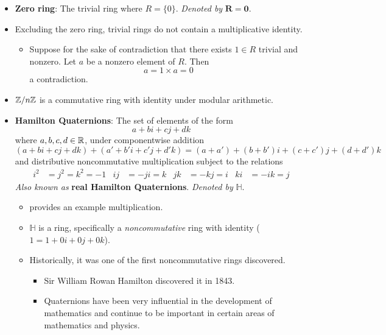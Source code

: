 \documentclass[../notes.tex]{subfiles}
\begin{document}
\begin{itemize}
\begin{itemize}
    \end{itemize}
    \item \textbf{Zero ring}: The trivial ring where $R=\{0\}$. \emph{Denoted by} $\bm{R=0}$.
    \item Excluding the zero ring, trivial rings do not contain a multiplicative identity.
    \begin{itemize}
        \item Suppose for the sake of contradiction that there exists $1\in R$ trivial and nonzero. Let $a$ be a nonzero element of $R$. Then
        \begin{equation*}
            a = 1\times a = 0
        \end{equation*}
        a contradiction.
    \end{itemize}
    \item $\mathbb{Z}/n\mathbb{Z}$ is a commutative ring with identity under modular arithmetic.
    \item \textbf{Hamilton Quaternions}: The set of elements of the form
    \begin{equation*}
        a+bi+cj+dk
    \end{equation*}
    where $a,b,c,d\in\mathbb{R}$, under componentwise addition
    \begin{equation*}
        (a+bi+cj+dk)+(a'+b'i+c'j+d'k) = (a+a')+(b+b')i+(c+c')j+(d+d')k
    \end{equation*}
    and distributive noncommutative multiplication subject to the relations
    \begin{align*}
        i^2 &= j^2 = k^2 = -1&
        ij &= -ji = k&
        jk &= -kj = i&
        ki &= -ik = j
    \end{align*}
    \emph{Also known as} \textbf{real Hamilton Quaternions}. \emph{Denoted by} $\pmb{\mathbb{H}}$.
    \begin{itemize}
        \item \textcite{bib:DummitFoote} provides an example multiplication.
        \item $\mathbb{H}$ is a ring, specifically a \emph{noncommutative} ring with identity ($1=1+0i+0j+0k$).
        \item Historically, it was one of the first noncommutative rings discovered.
        \begin{itemize}
            \item Sir William Rowan Hamilton discovered it in 1843.
            \item Quaternions have been very influential in the development of mathematics and continue to be important in certain areas of mathematics and physics.

\end{itemize}
\end{itemize}
\end{itemize}
\end{document}

